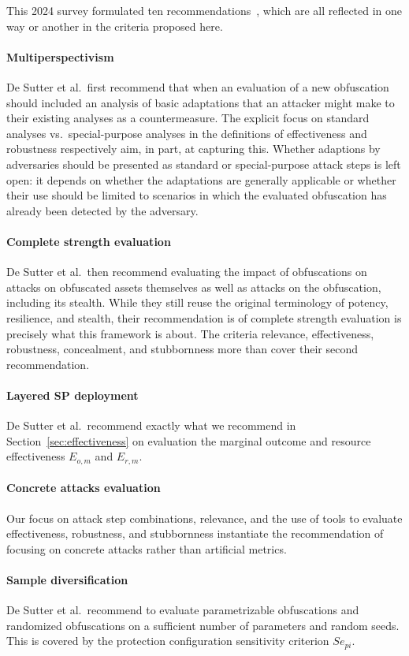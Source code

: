 This 2024 survey formulated ten recommendations~\cite{desutter2024evaluation}, which are all reflected in one way or another in the criteria proposed here.

\paragraph{Multiperspectivism} De Sutter et al.\ first recommend that when an evaluation of a new obfuscation should included an analysis of basic adaptations that an attacker might make to their existing analyses as a countermeasure. The explicit focus on standard analyses vs.\ special-purpose analyses in the definitions of effectiveness and robustness respectively aim, in part, at capturing this. Whether adaptions by adversaries should be presented as standard or special-purpose attack steps is left open: it depends on whether the adaptations are generally applicable or whether their use should be limited to scenarios in which the evaluated obfuscation has already been detected by the adversary. 
\paragraph{Complete strength evaluation} De Sutter et al.\ then recommend evaluating the impact of obfuscations on attacks on obfuscated assets themselves as well as attacks on the obfuscation, including its stealth. While they still reuse the original terminology of potency, resilience, and stealth, their recommendation is of complete strength evaluation is precisely what this framework is about. The criteria relevance, effectiveness, robustness, concealment, and stubbornness more than cover their second recommendation.  
\paragraph{Layered SP deployment} De Sutter et al.\ recommend exactly what we recommend in Section~\ref{sec:effectiveness} on evaluation the marginal outcome and resource effectiveness $E_{o,m}$ and $E_{r,m}$. 
\paragraph{Concrete attacks evaluation} Our focus on attack step combinations, relevance, and the use of tools to evaluate effectiveness, robustness, and stubbornness instantiate the recommendation of focusing on concrete attacks rather than artificial metrics. 
\paragraph{Sample diversification} De Sutter et al.\ recommend to evaluate parametrizable obfuscations and randomized obfuscations on a sufficient number of parameters and random seeds. This is covered by the protection configuration sensitivity criterion $Se_{pi}$.
